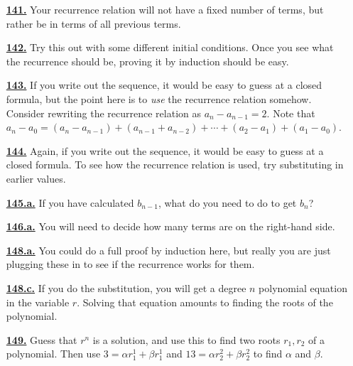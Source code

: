 \documentclass[10pt,]{book}
\theoremstyle{plain}
\theoremstyle{definition}
\theoremstyle{definition}
\theoremstyle{definition}
\numberwithin{equation}{chapter}
\begin{document}
\begin{itemize}[itemsep=1em]
\hypertarget{a-141}{}\item[\textbf{\hyperref[act-catalanfirst]{141.}}]
\hypertarget{p-915}{}%
Your recurrence relation will not have a fixed number of terms, but rather be in terms of all previous terms.%

\hypertarget{a-142}{}\item[\textbf{\hyperref[activity-135]{142.}}]
\hypertarget{p-919}{}%
Try this out with some different initial conditions.  Once you see what the recurrence should be, proving it by induction should be easy.%

\hypertarget{a-143}{}\item[\textbf{\hyperref[act-arithmetic]{143.}}]
\hypertarget{p-923}{}%
If you write out the sequence, it would be easy to guess at a closed formula, but the point here is to \emph{use} the recurrence relation somehow.  Consider rewriting the recurrence relation as \(a_n - a_{n-1} = 2\).  Note that \(a_n - a_0 = (a_n - a_{n-1}) + (a_{n-1} + a_{n-2}) + \cdots + (a_2 - a_1) + (a_1 - a_0)\).%

\hypertarget{a-144}{}\item[\textbf{\hyperref[act-geometric]{144.}}]
\hypertarget{p-925}{}%
Again, if you write out the sequence, it would be easy to guess at a closed formula.  To see how the recurrence relation is used, try substituting in earlier values.%

\hypertarget{a-145.a}{}\item[\textbf{\hyperref[task-173]{145.a.}}]
\hypertarget{p-931}{}%
If you have calculated \(b_{n-1}\), what do you need to do to get \(b_n\)?%

\hypertarget{a-146.a}{}\item[\textbf{\hyperref[task-177]{146.a.}}]
\hypertarget{p-939}{}%
You will need to decide how many terms are on the right-hand side.%

\hypertarget{a-148.a}{}\item[\textbf{\hyperref[task-180]{148.a.}}]
\hypertarget{p-948}{}%
You could do a full proof by induction here, but really you are just plugging these in to see if the recurrence works for them.%

\hypertarget{a-148.c}{}\item[\textbf{\hyperref[task-182]{148.c.}}]
\hypertarget{p-951}{}%
If you do the substitution, you will get a degree \(n\) polynomial equation in the variable \(r\).  Solving that equation amounts to finding the roots of the polynomial.%

\hypertarget{a-149}{}\item[\textbf{\hyperref[activity-142]{149.}}]
\hypertarget{p-954}{}%
Guess that \(r^n\) is a solution, and use this to find two roots \(r_1, r_2\) of a polynomial.  Then use \(3 = \alpha r_1^1 + \beta r_1^1\) and \(13 = \alpha r_2^2 + \beta r_2^2\) to find \(\alpha\) and \(\beta\).%


\end{itemize}
\end{document}
